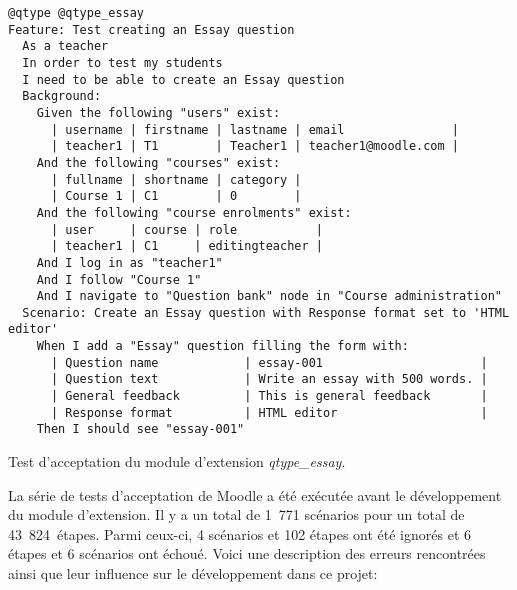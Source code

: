 \begin{lstfloat}
\begin{lstlisting}[frame=l]
@qtype @qtype_essay
Feature: Test creating an Essay question
  As a teacher
  In order to test my students
  I need to be able to create an Essay question
  Background:
    Given the following "users" exist:
      | username | firstname | lastname | email               |
      | teacher1 | T1        | Teacher1 | teacher1@moodle.com |
    And the following "courses" exist:
      | fullname | shortname | category |
      | Course 1 | C1        | 0        |
    And the following "course enrolments" exist:
      | user     | course | role           |
      | teacher1 | C1     | editingteacher |
    And I log in as "teacher1"
    And I follow "Course 1"
    And I navigate to "Question bank" node in "Course administration"
  Scenario: Create an Essay question with Response format set to 'HTML editor'
    When I add a "Essay" question filling the form with:
      | Question name            | essay-001                      |
      | Question text            | Write an essay with 500 words. |
      | General feedback         | This is general feedback       |
      | Response format          | HTML editor                    |
    Then I should see "essay-001"
\end{lstlisting}
\caption{Test d'acceptation du module d'extension \textit{qtype\_essay}.}
\label{code:behattest}
\end{lstfloat}
La s\'erie de tests d'acceptation de Moodle a \'et\'e ex\'ecut\'ee avant le d\'eveloppement du module d'extension.
Il y a un total de 1~771 sc\'enarios pour un total de 43~824~\'etapes.
Parmi ceux-ci, 4 sc\'enarios et 102 \'etapes ont \'et\'e ignor\'es et 6 \'etapes et 6 sc\'enarios ont \'echou\'e.
Voici une description des erreurs rencontr\'ees ainsi que leur influence sur le d\'eveloppement dans ce projet:
